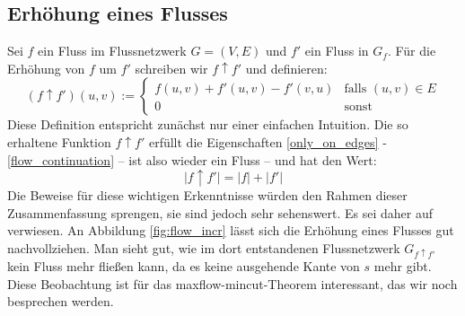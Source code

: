 \documentclass[12pt,a4paper,titlepage,onecolumn,ngerman,bibliography=totocnumbered]{scrartcl}
\theoremstyle{definition}
\theoremstyle{remark}
\begin{document}
\subsection{Erhöhung eines Flusses}
Sei $f$ ein Fluss im Flussnetzwerk $G = (V,E)$ und $f'$ ein Fluss in $G_f$.
Für die Erhöhung von $f$ um $f'$ schreiben wir $f \uparrow f'$ und definieren:
\begin{equation}
	(f \uparrow f')(u,v):=
	\begin{cases}
		f(u,v) + f'(u,v) - f'(v,u) & \text{falls $(u,v) \in E$} \\
		0                          & \text{sonst}
	\end{cases}
\end{equation}
Diese Definition entspricht zunächst nur einer einfachen Intuition.
\medbreak
Die so erhaltene Funktion $f\uparrow f'$ erfüllt die Eigenschaften \eqref{only_on_edges} - \eqref{flow_continuation} -- ist also wieder ein Fluss -- und hat den Wert:
\begin{equation}\label{flow_incr}
	\lvert f\uparrow f' \rvert = \lvert f \rvert + \lvert f'\rvert
\end{equation}
Die Beweise für diese wichtigen Erkenntnisse würden den Rahmen dieser Zusammenfassung sprengen, sie sind jedoch sehr sehenswert.
Es sei daher auf \cite[][S. 730-732]{Cormen09} verwiesen.
An Abbildung \ref{fig:flow_incr} lässt sich die Erhöhung eines Flusses gut nachvollziehen.
Man sieht gut, wie im dort entstandenen Flussnetzwerk $G_{f\uparrow f'}$ kein Fluss mehr fließen kann, da es keine ausgehende Kante von $s$ mehr gibt.
Diese Beobachtung ist für das maxflow-mincut-Theorem interessant, das wir noch besprechen werden.
\end{document}

